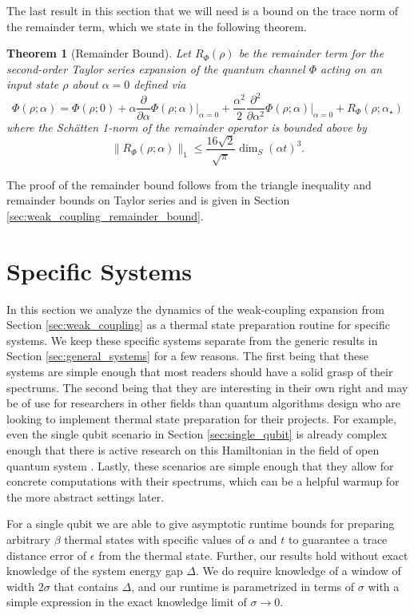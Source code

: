 \documentclass{article}
\newtheorem{theorem}{Theorem}
\newcommand{\norm}[1]{\| #1 \|}
\begin{document}
The last result in this section that we will need is a bound on the trace norm of the remainder term, which we state in the following theorem.
\begin{theorem}[Remainder Bound] \label{thm:remainder_bound}
    Let $R_{\Phi}(\rho)$ be the remainder term for the second-order Taylor series expansion 
of the quantum channel $\Phi$ acting on an input state $\rho$ about $\alpha=0$ defined via
    $$\Phi(\rho; \alpha) = \Phi(\rho; 0) + \alpha \frac{\partial}{\partial \alpha} \Phi(\rho; \alpha) \big|_{\alpha = 0} + \frac{\alpha^2}{2} \frac{\partial^2}{\partial \alpha^2} \Phi(\rho; \alpha) \big|_{\alpha = 0} + R_{\Phi}(\rho; \alpha_{\star})$$ where the Sch\"{a}tten 1-norm of the remainder operator is bounded above by
    \begin{equation}
        \norm{R_{\Phi}(\rho;\alpha)}_1 \le \frac{16 \sqrt{2}}{\sqrt{\pi}} \dim_S (\alpha t)^3.
    \end{equation}
\end{theorem}
The proof of the remainder bound follows from the triangle inequality and remainder bounds on Taylor series and is given in Section \ref{sec:weak_coupling_remainder_bound}.



\section{Specific Systems}
In this section we analyze the dynamics of the weak-coupling expansion from Section \ref{sec:weak_coupling} as a thermal state preparation routine for specific systems. We keep these specific systems separate from the generic results in Section \ref{sec:general_systems} for a few reasons. The first being that these systems are simple enough that most readers should have a solid grasp of their spectrums. The second being that they are interesting in their own right and may be of use for researchers in other fields than quantum algorithms design who are looking to implement thermal state preparation for their projects. For example, even the single qubit scenario in Section \ref{sec:single_qubit} is already complex enough that there is active research on this Hamiltonian in the field of open quantum system \cite{prositto2025equilibrium}. Lastly, these scenarios are simple enough that they allow for concrete computations with their spectrums, which can be a helpful warmup for the more abstract settings later. 

For a single qubit we are able to give asymptotic runtime bounds for preparing arbitrary $\beta$ thermal states with specific values of $\alpha$ and $t$ to guarantee a trace distance error of $\epsilon$ from the thermal state. Further, our results hold without exact knowledge of the system energy gap $\Delta$. We do require knowledge of a window of width $2 \sigma$ that contains $\Delta$, and our runtime is parametrized in terms of $\sigma$ with a simple expression in the exact knowledge limit of $\sigma \to 0$.
\end{document}
